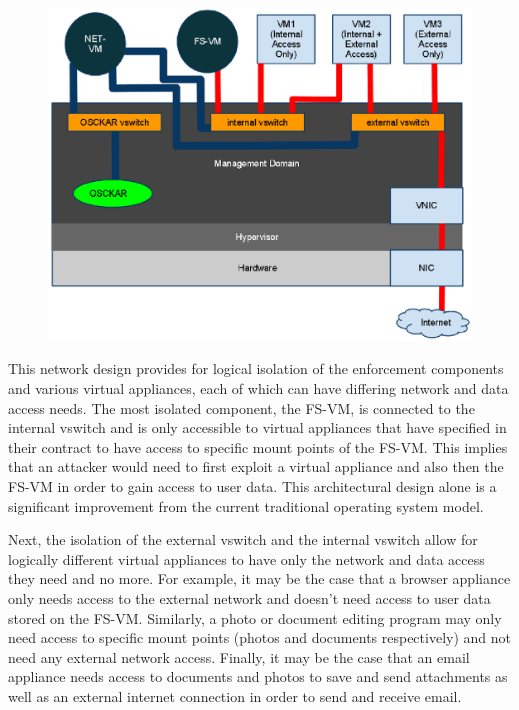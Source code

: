 \begin{figure}[tbp]
\begin{centering}
\label{fig:NetworkArchitecture}
\includegraphics[scale=0.9,angle=90]{figs/NetworkArchitecture}
\end{centering} 
\end{figure}

This network design provides for logical isolation of the enforcement components and various virtual appliances, each of which can have differing network and data access needs. The most isolated component, the FS-VM, is connected to the internal vswitch and is only accessible to virtual appliances that have specified in their contract to have access to specific mount points of the FS-VM. This implies that an attacker would need to first exploit a virtual appliance and also then the FS-VM in order to gain access to user data. This architectural design alone is a significant improvement from the current traditional operating system model.

Next, the isolation of the external vswitch and the internal vswitch allow for logically different virtual appliances to have only the network and data access they need and no more. For example, it may be the case that a browser appliance only needs access to the external network and doesn't need access to user data stored on the FS-VM. Similarly, a photo or document editing program may only need access to specific mount points (photos and documents respectively) and not need any external network access. Finally, it may be the case that an email appliance needs access to documents and photos to save and send attachments as well as an external internet connection in order to send and receive email.

